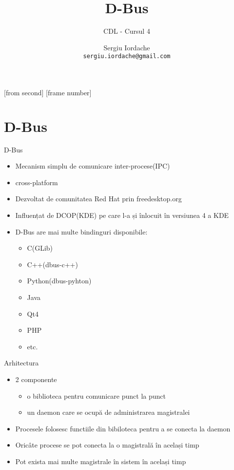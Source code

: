 \documentclass{beamer}
\title[D-Bus]{D-Bus}
\subtitle{CDL - Cursul 4}
\institute{ROSEdu}
\author{Sergiu Iordache \\\texttt{sergiu.iordache@gmail.com}}
\begin{document}
[from second]
[frame number]

\frame{\titlepage}

\frame{\tableofcontents}

\section{D-Bus}
\frame{\tableofcontents[currentsection]}

\begin{frame}{D-Bus}
\begin{itemize}
\item Mecanism simplu de comunicare inter-procese(IPC)
\item cross-platform
\item Dezvoltat de comunitatea Red Hat prin freedesktop.org
\item Influențat de DCOP(KDE) pe care l-a și înlocuit în versiunea 4 a KDE 
\item \pause D-Bus are mai multe bindinguri disponibile:
	\begin{itemize}
		\item C(GLib)
		\item C++(dbus-c++)
		\item Python(dbus-pyhton)
		\item Java
		\item Qt4
		\item PHP
		\item etc.
	\end{itemize}
\end{itemize}
\end{frame}

\begin{frame}{Arhitectura}
\begin{itemize}
\item 2 componente 
	\begin{itemize}
		\item o biblioteca pentru comunicare punct la punct 
		\item un daemon care se ocupă de administrarea magistralei
	\end{itemize}
\item \pause Procesele folosesc functiile din bibiloteca pentru a se conecta la daemon
\item \pause Oricâte procese se pot conecta la o magistrală în același timp
\item \pause Pot exista mai multe magistrale în sistem în același timp
\end{itemize}
\end{frame}
\end{document}
